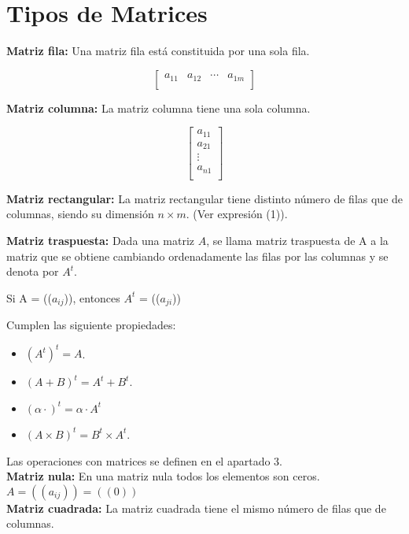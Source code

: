 \documentclass[10pt]{article}
\begin{document}
\section{Tipos de Matrices}

\noindent\textbf{Matriz fila:} Una matriz fila está constituida por una sola fila.

\[\begin{bmatrix}
a_{11} & a_{12} & \cdots & a_{1m} \\
\end{bmatrix}\]

\noindent\textbf{Matriz columna:} La matriz columna tiene una sola columna.

\[\begin{bmatrix}
a_{11} \\
a_{21} \\
\vdots \\
a_{n1} \\
\end{bmatrix}\]

\textbf{Matriz rectangular:} La matriz rectangular tiene distinto número de filas que de columnas, siendo su dimensión $n\times {m}$. (Ver expresión (1)).

\textbf{Matriz traspuesta:} Dada una matriz $A$, se llama matriz traspuesta de A a la matriz que se obtiene cambiando ordenadamente las filas por las columnas y se denota por $A^t$.

Si A = (($a_{ij}$)), entonces $A^t$ = (($a_{ji}$))

Cumplen las siguiente propiedades:

\begin{itemize}
\item $(A^t)^t = A$.
\item $(A + B)^t = A^t + B^t$.
\item $(\alpha \cdot )^t = \alpha \cdot {A^t}$
\item $(A\times B)^t = B^t\times A^t$.
\end{itemize}
Las operaciones con matrices se definen en el apartado 3. \\


\textbf{Matriz nula:} En una matriz nula todos los elementos son ceros. $A = ((a_{ij})) = ((0))$ \\

\textbf{Matriz cuadrada:} La matriz cuadrada tiene el mismo número de filas que de columnas.
\end{document}
